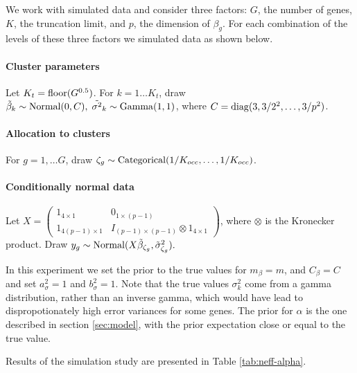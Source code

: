We work with simulated data and consider three factors: $G$, the number of genes, $K$, the truncation limit, and $p$, the dimension of $\beta_g$. For each combination of the levels of these three factors we simulated data as shown below.

\paragraph{Cluster parameters}
Let $K_{t} = \operatorname{floor}(G^{0.5})$. For $k=1 \ldots K_{t}$, draw $\tilde{\beta}_k \sim \operatorname{Normal}(0, C),\; \tilde{\sigma^2}_k \sim \operatorname{Gamma}(1, 1)$, where $C=\operatorname{diag}(3, 3/2^2, \ldots, 3/p^2)$.
  
\paragraph{Allocation to clusters} For $g=1,\ldots G$, draw $\zeta_g \sim \operatorname{Categorical}(1/K_{occ},\ldots,1/K_{occ})$. 
  
\paragraph{Conditionally normal data}
 Let $X = \begin{pmatrix} 1_{4 \times 1} & 0_{1\times(p-1)}\\
                                 1_{4(p-1) \times 1} & I_{(p-1)\times(p-1)} \otimes 1_{4\times 1} \end{pmatrix}$, where $\otimes$ is the Kronecker product. Draw $y_{g} \sim \operatorname{Normal}(X\tilde{\beta}_{\zeta_g}, \tilde{\sigma}^2_{\zeta_g}).$


In this experiment we set the prior to the true values for $m_\beta = m$, and $C_\beta = C$ and set $a_\sigma^2=1$ and $b_\sigma^2=1$. Note that the true values $\sigma^2_k$ come from a gamma distribution, rather than an inverse gamma, which would have lead to dispropotionately high error variances for some genes. The prior for $\alpha$ is the one described in section \ref{sec:model}, with the prior expectation close or equal to the true value.

Results of the simulation study are presented in Table \ref{tab:neff-alpha}.

